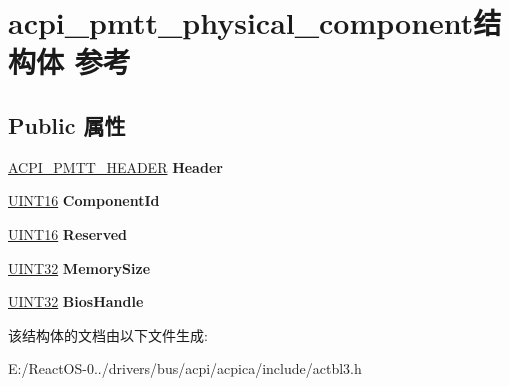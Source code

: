 \hypertarget{structacpi__pmtt__physical__component}{}\section{acpi\+\_\+pmtt\+\_\+physical\+\_\+component结构体 参考}
\label{structacpi__pmtt__physical__component}
\subsection*{Public 属性}
\begin{DoxyCompactItemize}
\item 
\mbox{\label{structacpi__pmtt__physical__component_ad786d6964c01111f9f2eeee5f28b2fe7}} 
\hyperlink{structacpi__pmtt__header}{A\+C\+P\+I\+\_\+\+P\+M\+T\+T\+\_\+\+H\+E\+A\+D\+ER} {\bfseries Header}
\item 
\mbox{\label{structacpi__pmtt__physical__component_a73ed461078895a8d3b5d0d0bb126b580}} 
\hyperlink{_processor_bind_8h_a09f1a1fb2293e33483cc8d44aefb1eb1}{U\+I\+N\+T16} {\bfseries Component\+Id}
\item 
\mbox{\label{structacpi__pmtt__physical__component_a25ec94c960c5791c57b21c667c5285ca}} 
\hyperlink{_processor_bind_8h_a09f1a1fb2293e33483cc8d44aefb1eb1}{U\+I\+N\+T16} {\bfseries Reserved}
\item 
\mbox{\label{structacpi__pmtt__physical__component_a3781ef4557db23f7bba73cdbf44bba5c}} 
\hyperlink{_processor_bind_8h_ae1e6edbbc26d6fbc71a90190d0266018}{U\+I\+N\+T32} {\bfseries Memory\+Size}
\item 
\mbox{\label{structacpi__pmtt__physical__component_a294470bad707cc720000751ebc08dcda}} 
\hyperlink{_processor_bind_8h_ae1e6edbbc26d6fbc71a90190d0266018}{U\+I\+N\+T32} {\bfseries Bios\+Handle}
\end{DoxyCompactItemize}


该结构体的文档由以下文件生成\+:\begin{DoxyCompactItemize}
\item 
E\+:/\+React\+O\+S-\/0../drivers/bus/acpi/acpica/include/actbl3.\+h\end{DoxyCompactItemize}
